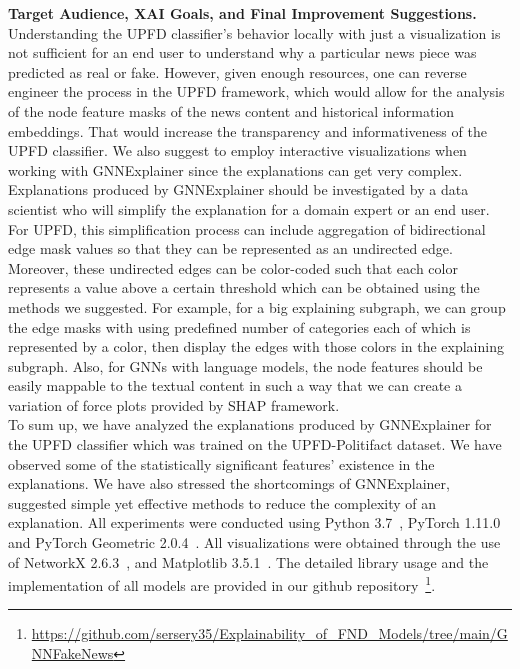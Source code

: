 \textbf{Target Audience, XAI Goals, and Final Improvement Suggestions.} Understanding the UPFD classifier's behavior locally with just a visualization is not sufficient for an end user to understand why a particular news piece was predicted as real or fake. However, given enough resources, one can reverse engineer the process in the UPFD framework, which would allow for the analysis of the node feature masks of the news content and historical information embeddings. That would increase the transparency and informativeness of the UPFD classifier. We also suggest to employ interactive visualizations when working with GNNExplainer since the explanations can get very complex. Explanations produced by GNNExplainer should be investigated by a data scientist who will simplify the explanation for a domain expert or an end user. For UPFD, this simplification process can include aggregation of bidirectional edge mask values so that they can be represented as an undirected edge. Moreover, these undirected edges can be color-coded such that each color represents a value above a certain threshold which can be obtained using the methods we suggested. For example, for a big explaining subgraph, we can group the edge masks with using predefined number of categories each of which is represented by a color, then display the edges with those colors in the explaining subgraph. Also, for GNNs with language models, the node features should be easily mappable to the textual content in such a way that we can create a variation of force plots provided by SHAP framework.\\
To sum up, we have analyzed the explanations produced by GNNExplainer for the UPFD classifier which was trained on the UPFD-Politifact dataset. We have observed some of the statistically significant features' existence in the explanations. We have also stressed the shortcomings of GNNExplainer, suggested simple yet effective methods to reduce the complexity of an explanation. All experiments were conducted using Python 3.7~\parencite{Python_Rossum}, PyTorch 1.11.0~\parencite{PyTorch_Paszke} and PyTorch Geometric 2.0.4~\parencite{PyTorchGeometric_Fey}. All visualizations were obtained through the use of NetworkX 2.6.3~\parencite{NetworkX_Hagberg}, and Matplotlib 3.5.1~\parencite{Matplotlib_Hunter}. The detailed library usage and the implementation of all models are provided in our github repository~\footnote{\url{https://github.com/sersery35/Explainability_of_FND_Models/tree/main/GNNFakeNews}}.